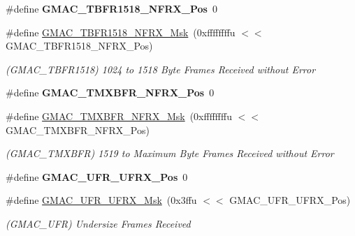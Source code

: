 \begin{DoxyCompactItemize}
\mbox{\label{group__SAMV71__GMAC_ga36796f4443b057da440f3d64ffddd082}} 
\#define {\bfseries G\+M\+A\+C\+\_\+\+T\+B\+F\+R1518\+\_\+\+N\+F\+R\+X\+\_\+\+Pos}~0
\item 
\mbox{\label{group__SAMV71__GMAC_ga028e1187101eff54cfce02d8898af514}} 
\#define \mbox{\hyperlink{group__SAMV71__GMAC_ga028e1187101eff54cfce02d8898af514}{G\+M\+A\+C\+\_\+\+T\+B\+F\+R1518\+\_\+\+N\+F\+R\+X\+\_\+\+Msk}}~(0xffffffffu $<$$<$ G\+M\+A\+C\+\_\+\+T\+B\+F\+R1518\+\_\+\+N\+F\+R\+X\+\_\+\+Pos)
\begin{DoxyCompactList}\small\item\em (G\+M\+A\+C\+\_\+\+T\+B\+F\+R1518) 1024 to 1518 Byte Frames Received without Error \end{DoxyCompactList}\item 
\mbox{\label{group__SAMV71__GMAC_gaa502c20a4ce3e531acbeb82c0b4c77e4}} 
\#define {\bfseries G\+M\+A\+C\+\_\+\+T\+M\+X\+B\+F\+R\+\_\+\+N\+F\+R\+X\+\_\+\+Pos}~0
\item 
\mbox{\label{group__SAMV71__GMAC_ga384a4e29974a6b82cf2365dbb5137368}} 
\#define \mbox{\hyperlink{group__SAMV71__GMAC_ga384a4e29974a6b82cf2365dbb5137368}{G\+M\+A\+C\+\_\+\+T\+M\+X\+B\+F\+R\+\_\+\+N\+F\+R\+X\+\_\+\+Msk}}~(0xffffffffu $<$$<$ G\+M\+A\+C\+\_\+\+T\+M\+X\+B\+F\+R\+\_\+\+N\+F\+R\+X\+\_\+\+Pos)
\begin{DoxyCompactList}\small\item\em (G\+M\+A\+C\+\_\+\+T\+M\+X\+B\+FR) 1519 to Maximum Byte Frames Received without Error \end{DoxyCompactList}\item 
\mbox{\label{group__SAMV71__GMAC_ga5cc67bf35b11a3722d638f84f9ee75b5}} 
\#define {\bfseries G\+M\+A\+C\+\_\+\+U\+F\+R\+\_\+\+U\+F\+R\+X\+\_\+\+Pos}~0
\item 
\mbox{\label{group__SAMV71__GMAC_gac817943c6d2d169e5aa703fd924bfa60}} 
\#define \mbox{\hyperlink{group__SAMV71__GMAC_gac817943c6d2d169e5aa703fd924bfa60}{G\+M\+A\+C\+\_\+\+U\+F\+R\+\_\+\+U\+F\+R\+X\+\_\+\+Msk}}~(0x3ffu $<$$<$ G\+M\+A\+C\+\_\+\+U\+F\+R\+\_\+\+U\+F\+R\+X\+\_\+\+Pos)
\begin{DoxyCompactList}\small\item\em (G\+M\+A\+C\+\_\+\+U\+FR) Undersize Frames Received \end{DoxyCompactList}\item 
$$
\end{DoxyCompactItemize}
